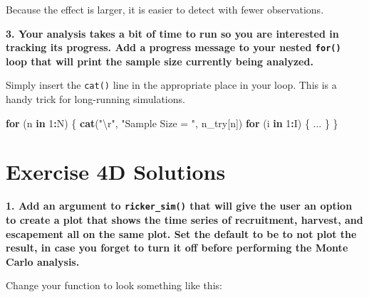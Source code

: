 \documentclass[]{book}
\newenvironment{Shaded}{\begin{snugshade}}{\end{snugshade}}
\newcommand{\KeywordTok}[1]{\textcolor[rgb]{0.13,0.29,0.53}{\textbf{#1}}}
\newcommand{\DecValTok}[1]{\textcolor[rgb]{0.00,0.00,0.81}{#1}}
\newcommand{\CharTok}[1]{\textcolor[rgb]{0.31,0.60,0.02}{#1}}
\newcommand{\StringTok}[1]{\textcolor[rgb]{0.31,0.60,0.02}{#1}}
\newcommand{\ControlFlowTok}[1]{\textcolor[rgb]{0.13,0.29,0.53}{\textbf{#1}}}
\newcommand{\OperatorTok}[1]{\textcolor[rgb]{0.81,0.36,0.00}{\textbf{#1}}}
\newcommand{\NormalTok}[1]{#1}
\theoremstyle{definition}
\theoremstyle{definition}
\theoremstyle{definition}
\theoremstyle{remark}
\begin{document}
Because the effect is larger, it is easier to detect with fewer
observations.

\textbf{3. Your analysis takes a bit of time to run so you are
interested in tracking its progress. Add a progress message to your
nested \texttt{for()} loop that will print the sample size currently
being analyzed.}

Simply insert the \texttt{cat()} line in the appropriate place in your
loop. This is a handy trick for long-running simulations.

\begin{Shaded}
\begin{Highlighting}[]
\ControlFlowTok{for}\NormalTok{ (n }\ControlFlowTok{in} \DecValTok{1}\OperatorTok{:}\NormalTok{N) \{}
  \KeywordTok{cat}\NormalTok{(}\StringTok{"}\CharTok{\textbackslash{}r}\StringTok{"}\NormalTok{, }\StringTok{"Sample Size = "}\NormalTok{, n_try[n])}
  \ControlFlowTok{for}\NormalTok{ (i }\ControlFlowTok{in} \DecValTok{1}\OperatorTok{:}\NormalTok{I) \{}
\NormalTok{    ...}
\NormalTok{  \}}
\NormalTok{\}}
\end{Highlighting}
\end{Shaded}

\hypertarget{ex4d-answers}{\section*{Exercise 4D
Solutions}\label{ex4d-answers}}

\textbf{1. Add an argument to \texttt{ricker\_sim()} that will give the
user an option to create a plot that shows the time series of
recruitment, harvest, and escapement all on the same plot. Set the
default to be to not plot the result, in case you forget to turn it off
before performing the Monte Carlo analysis.}

Change your function to look something like this:
\end{document}
